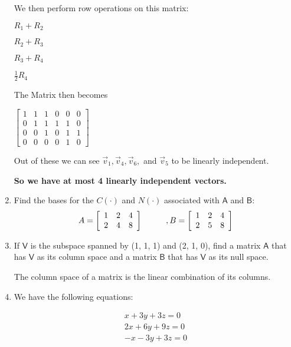 \documentclass[a4paper, 11pt]{article}
\newcommand{\mat}[1]{\boldsymbol { \mathsf{#1}} }
\begin{document}
\begin{enumerate}
\begin{center}
\end{center}

We then perform row operations on this matrix:
\begin{center}
$R_1 + R_2$

$R_2 + R_3$

$R_3 + R_4$

$\frac{1}{2} R_4$
\end{center}

The Matrix then becomes 

\begin{center}
$
\begin{bmatrix}
1 & 1 & 1 & 0 & 0 & 0 \\
0 & 1 & 1 & 1 & 1 & 0\\
0 & 0 & 1 & 0 & 1 & 1\\ 
0 & 0 & 0 & 0 & 1 & 0 
\end{bmatrix}
$
\end{center}

Out of these we can see $\vec v_1, \vec v_4, \vec v_6,$ and $\vec v_5$ to be linearly independent.

\textbf{So we have at most 4 linearly independent vectors.}


\item Find the bases for the $C(\mat \cdot)$ and $N(\mat \cdot)$ associated with $\mat A$ and $\mat B$:
\[ A = \left[ \begin{array}{ccc}
1&2&4\\
2&4&8
\end{array} \right]
\hspace{10mm}, B = \left[ \begin{array}{ccc}
1&2&4\\
2&5&8
\end{array} \right]\]

\item If $\mat V$ is the subspace spanned by (1, 1, 1) and (2, 1, 0), find a matrix $\mat A$ that has $\mat V$ as its column space and a matrix $\mat B$ that has $\mat V$ as its null space.

The column space of a matrix is the linear combination of its columns. 



\item We have the following equations:

\begin{equation} \label{eq1}
\begin{split}
x + 3y + 3z  = 0\\
2x + 6y + 9z = 0\\
-x - 3y +3z  = 0
\end{split}
\end{equation}


\end{enumerate}
\end{document}
